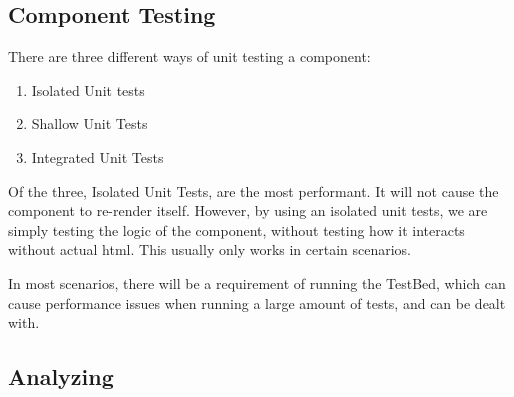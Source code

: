 \subsection{ Component Testing }
There are three different ways of unit testing a component:
\begin{enumerate}
  \item Isolated Unit tests
  \item Shallow Unit Tests
  \item Integrated Unit Tests
\end{enumerate}

Of the three, Isolated Unit Tests, are the most performant. It will not cause
the component to re-render itself. However, by using an isolated unit tests,
we are simply testing the logic of the component, without testing how it
interacts without actual html. This usually only works in certain scenarios.

In most scenarios, there will be a requirement of running the TestBed, which
can cause performance issues when running a large amount of tests, and can be
dealt with.

\subsection{ Analyzing }
